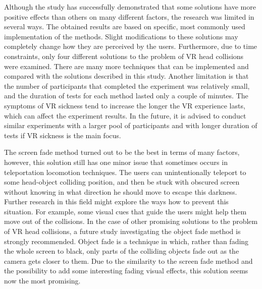 Although the study has successfully demonstrated that some solutions have more positive effects than others on many different factors, the research was limited in several ways. The obtained results are based on specific, most commonly used implementation of the methods. Slight modifications to these solutions may completely change how they are perceived by the users. Furthermore, due to time constraints, only four different solutions to the problem of VR head collisions were examined. There are many more techniques that can be implemented and compared with the solutions described in this study. Another limitation is that the number of participants that completed the experiment was relatively small, and the duration of tests for each method lasted only a couple of minutes. The symptoms of VR sickness tend to increase the longer the VR experience lasts, which can affect the experiment results. In the future, it is advised to conduct similar experiments with a larger pool of participants and with longer duration of tests if VR sickness is the main focus.

The screen fade method turned out to be the best in terms of many factors, however, this solution still has one minor issue that sometimes occurs in teleportation locomotion techniques. The users can unintentionally teleport to some head-object colliding position, and then be stuck with obscured screen without knowing in what direction he should move to escape this darkness. Further research in this field might explore the ways how to prevent this situation. For example, some visual cues that guide the users might help them move out of the collisions. In the case of other promising solutions to the problem of VR head collisions, a future study investigating the object fade method is strongly recommended. Object fade is a technique in which, rather than fading the whole screen to black, only parts of the colliding objects fade out as the camera gets closer to them. Due to the similarity to the screen fade method and the possibility to add some interesting fading visual effects, this solution seems now the most promising.